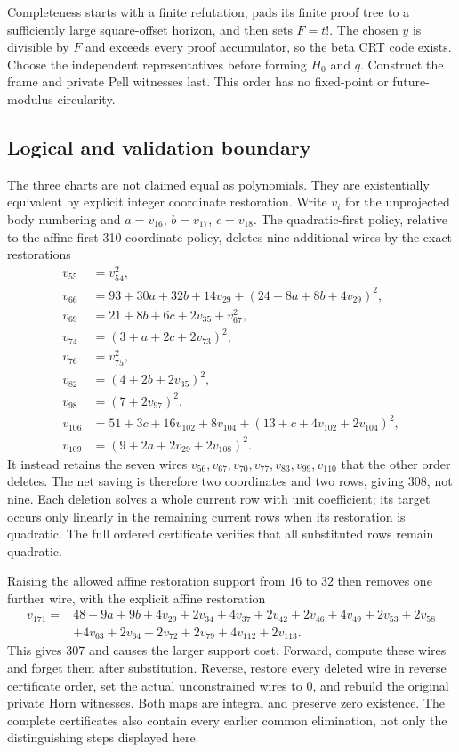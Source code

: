 \documentclass[11pt]{article}
\begin{document}
Completeness starts with a finite refutation, pads its finite proof tree to
a sufficiently large square-offset horizon, and then sets $F=t!$.
The chosen $y$ is divisible by $F$ and exceeds every proof accumulator, so
the beta CRT code exists. Choose the independent representatives before
forming $H_0$ and $q$. Construct the frame and private Pell witnesses last.
This order has no fixed-point or future-modulus circularity.

\subsection{Logical and validation boundary}
The three charts are not claimed equal as polynomials. They are existentially
equivalent by explicit integer coordinate restoration. Write $v_i$ for the
unprojected body numbering and $a=v_{16}$, $b=v_{17}$, $c=v_{18}$.
The quadratic-first policy, relative to the affine-first 310-coordinate
policy, deletes nine additional wires by the exact restorations
\begin{align*}
 v_{55}&=v_{54}^2,\\
 v_{66}&=93+30a+32b+14v_{29}+(24+8a+8b+4v_{29})^2,\\
 v_{69}&=21+8b+6c+2v_{35}+v_{67}^2,\\
 v_{74}&=(3+a+2c+2v_{73})^2,\\
 v_{76}&=v_{75}^2,\\
 v_{82}&=(4+2b+2v_{35})^2,\\
 v_{98}&=(7+2v_{97})^2,\\
 v_{106}&=51+3c+16v_{102}+8v_{104}
             +(13+c+4v_{102}+2v_{104})^2,\\
 v_{109}&=(9+2a+2v_{29}+2v_{108})^2.
\end{align*}
It instead retains the seven wires
$v_{56},v_{67},v_{70},v_{77},v_{83},v_{99},v_{110}$ that the other
order deletes. The net saving is therefore two coordinates and two rows,
giving 308, not nine. Each deletion solves a whole current row with unit
coefficient; its target occurs only linearly in the remaining current rows
when its restoration is quadratic. The full ordered certificate verifies
that all substituted rows remain quadratic.

Raising the allowed affine restoration support from $16$ to $32$ then removes
one further wire, with the explicit affine restoration
\begin{align*}
v_{171}={}&48+9a+9b+4v_{29}+2v_{34}+4v_{37}+2v_{42}+2v_{46}
 +4v_{49}+2v_{53}+2v_{58}\\
 &+4v_{63}+2v_{64}+2v_{72}+2v_{79}+4v_{112}+2v_{113}.
\end{align*}
This gives 307 and causes the larger support cost. Forward, compute these
wires and forget them after substitution. Reverse, restore every deleted
wire in reverse certificate order, set the actual unconstrained wires to $0$,
and rebuild the original private Horn witnesses. Both maps are integral and
preserve zero existence. The complete certificates also contain every earlier
common elimination, not only the distinguishing steps displayed here.
\end{document}

